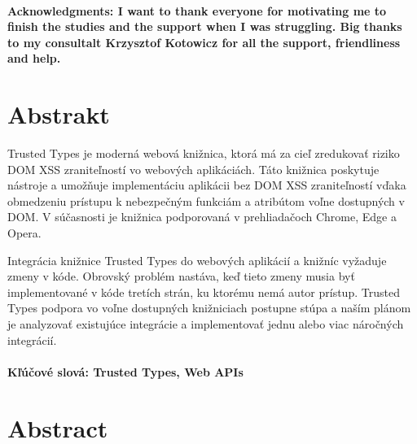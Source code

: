 \documentclass[12pt, twoside]{book}
\begin{document}
\newpage
\thispagestyle{empty}



\frontmatter

\setcounter{page}{3}
\newpage
~

\vfill
{\bf Acknowledgments: I want to thank everyone for motivating me to finish the studies and the
  support when I was struggling. Big thanks to my consultalt Krzysztof Kotowicz for all the support,
  friendliness and help.}


\newpage
\section*{Abstrakt}

Trusted Types je moderná webová knižnica, ktorá má za cieľ zredukovať riziko DOM XSS zraniteľností
vo webových aplikáciách. Táto knižnica poskytuje nástroje a umožňuje implementáciu aplikácii bez DOM
XSS zraniteľností vďaka obmedzeniu prístupu k nebezpečným funkciám a atribútom voľne dostupných v
DOM. V súčasnosti je knižnica podporovaná v prehliadačoch Chrome, Edge a Opera.

Integrácia knižnice Trusted Types do webových aplikácií a knižníc vyžaduje zmeny v kóde. Obrovský
problém nastáva, keď tieto zmeny musia byť implementované v kóde tretích strán, ku ktorému nemá
autor prístup. Trusted Types podpora vo voľne dostupných knižniciach postupne stúpa a naším plánom
je analyzovať existujúce integrácie a implementovať jednu alebo viac náročných integrácií.

\paragraph*{Kľúčové slová: Trusted Types, Web APIs}


\newpage
\section*{Abstract}
\end{document}
